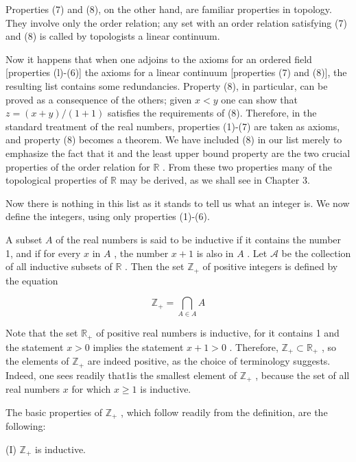 Properties (7) and (8), on the other hand, are familiar properties in topology. They involve only the order relation; any set with an order relation satisfying (7) and (8) is called by topologists a linear continuum.

Now it happens that when one adjoins to the axioms for an ordered field [properties (l)-(6)] the axioms for a linear continuum [properties (7) and (8)], the resulting list contains some redundancies. Property (8), in particular, can be proved as a consequence of the others; given \(x < y\) one can show that \(z = \left( {x + y}\right) /\left( {1 + 1}\right)\) satisfies the requirements of (8). Therefore, in the standard treatment of the real numbers, properties (1)-(7) are taken as axioms, and property (8) becomes a theorem. We have included (8) in our list merely to emphasize the fact that it and the least upper bound property are the two crucial properties of the order relation for \(\mathbb{R}\) . From these two properties many of the topological properties of \(\mathbb{R}\) may be derived, as we shall see in Chapter 3.

Now there is nothing in this list as it stands to tell us what an integer is. We now define the integers, using only properties (1)-(6).

\begin{definition} A subset \(A\) of the real numbers is said to be inductive if it contains the number 1, and if for every \(x\) in \(A\) , the number \(x + 1\) is also in \(A\) . Let \(\mathcal{A}\) be the collection of all inductive subsets of \(\mathbb{R}\) . Then the set \({\mathbb{Z}}_{ + }\) of positive integers is defined by the equation


\[
{\mathbb{Z}}_{ + } = \mathop{\bigcap }\limits_{{A \in  A}}A
\]
\end{definition}

Note that the set \({\mathbb{R}}_{ + }\) of positive real numbers is inductive, for it contains 1 and the statement \(x > 0\) implies the statement \(x + 1 > 0\) . Therefore, \({\mathbb{Z}}_{ + } \subset  {\mathbb{R}}_{ + }\) , so the elements of \({\mathbb{Z}}_{ + }\) are indeed positive, as the choice of terminology suggests. Indeed, one sees readily that1is the smallest element of \({\mathbb{Z}}_{ + }\) , because the set of all real numbers \(x\) for which \(x \geq  1\) is inductive.

The basic properties of \({\mathbb{Z}}_{ + }\) , which follow readily from the definition, are the following:

(I) \({\mathbb{Z}}_{ + }\) is inductive.

